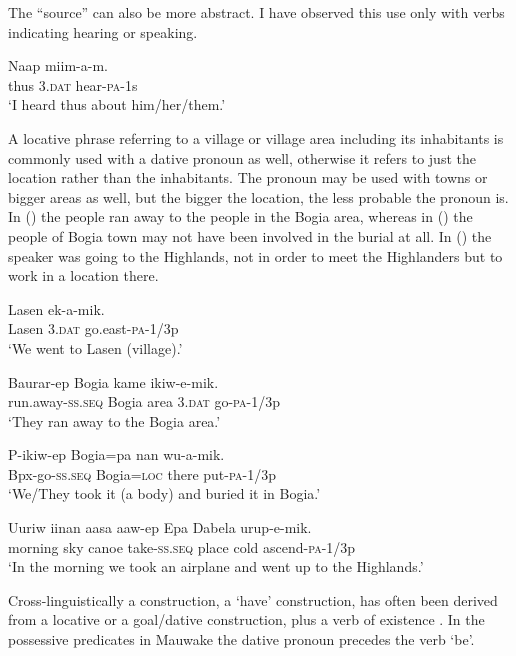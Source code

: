 The ``source'' can also be more abstract. I have observed this use only with verbs indicating hearing or speaking.

\ea%
\label{ex:x1786}
\gll Naap  miim-a-m. \\
thus 3.\textsc{dat} hear-\textsc{pa}-1s\\
\glt`I heard thus about him/her/them.'
\z

A locative phrase referring to a village or village area including its inhabitants is commonly used with a dative pronoun as well, otherwise it refers to just the location rather than the inhabitants. The pronoun may be used with towns or bigger areas as well, but the bigger the location, the less probable the pronoun is. In () the people ran away to the people in the Bogia area, whereas in () the people of Bogia town may not have been involved in the burial at all. In () the speaker was going to the Highlands, not in order to meet the Highlanders but to work in a location there. 

\ea%
\label{ex:x586}
\gll Lasen  ek-a-mik. \\
Lasen 3.\textsc{dat} go.east-\textsc{pa}-1/3p\\
\glt`We went to Lasen (village).'
\z

\ea%
\label{ex:x587}
\gll Baurar-ep Bogia kame  ikiw-e-mik. \\
run.away-\textsc{ss}.\textsc{seq} Bogia area 3.\textsc{dat} go-\textsc{pa}-1/3p\\
\glt`They ran away to the Bogia area.'
\z

\ea%
\label{ex:x1802}
\gll P-ikiw-ep Bogia=pa nan wu-a-mik. \\
Bpx-go-\textsc{ss}.\textsc{seq} Bogia=\textsc{loc} there put-\textsc{pa}-1/3p\\
\glt`We/They took it (a body) and buried it in Bogia.'
\z

\ea%
\label{ex:x1800}
\gll Uuriw iinan aasa aaw-ep Epa Dabela urup-e-mik. \\
morning sky canoe take-\textsc{ss}.\textsc{seq} place cold ascend-\textsc{pa}-1/3p\\
\glt`In the morning we took an airplane and went up to the Highlands.'
\z

Cross-linguistically a  construction, a `have' construction, has often been derived from a locative or a goal/dative construction, plus a verb of existence \citep[50--61]{Heine1997}. In the possessive predicates in Mauwake the dative pronoun precedes the verb \textstyleStyleVernacularWordsItalic{-} `be'. 

